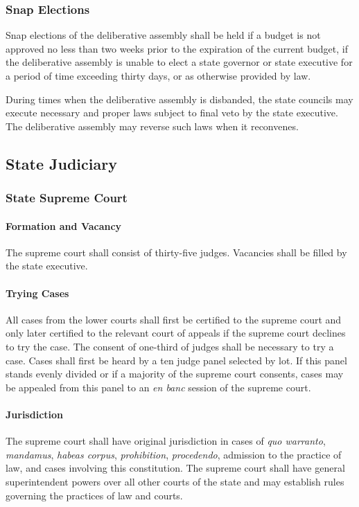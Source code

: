 \documentclass{article}
\begin{document}
\subsubsection{Snap Elections}
Snap elections of the deliberative assembly shall be held if a budget is not approved no less than two weeks prior to the expiration of the current budget, if the deliberative assembly is unable to elect a state governor or state executive for a period of time exceeding thirty days, or as otherwise provided by law.

During times when the deliberative assembly is disbanded, the state councils may execute necessary and proper laws subject to final veto by the state executive. The deliberative assembly may reverse such laws when it reconvenes.
\subsection{State Judiciary}
\subsubsection{State Supreme Court}
\paragraph{Formation and Vacancy}
The supreme court shall consist of thirty-five judges. Vacancies shall be filled by the state executive.
\paragraph{Trying Cases}
All cases from the lower courts shall first be certified to the supreme court and only later certified to the relevant court of appeals if the supreme court declines to try the case. The consent of one-third of judges shall be necessary to try a case. Cases shall first be heard by a ten judge panel selected by lot. If this panel stands evenly divided or if a majority of the supreme court consents, cases may be appealed from this panel to an \textit{en banc} session of the supreme court.
\paragraph{Jurisdiction}
The supreme court shall have original jurisdiction in cases of \textit{quo warranto}, \textit{mandamus}, \textit{habeas corpus}, \textit{prohibition}, \textit{procedendo}, admission to the practice of law, and cases involving this constitution. The supreme court shall have general superintendent powers over all other courts of the state and may establish rules governing the practices of law and courts.
\end{document}
